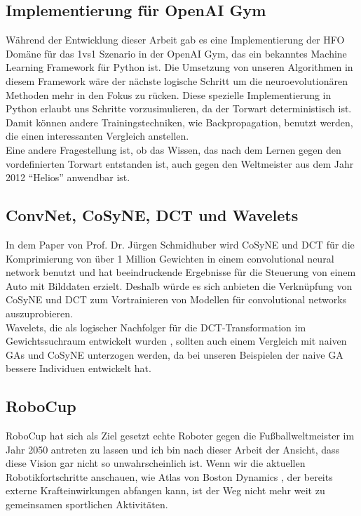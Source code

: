         \subsection*{Implementierung für OpenAI Gym}
            Während der Entwicklung dieser Arbeit gab es eine Implementierung der HFO Domäne für das 1vs1 Szenario in der OpenAI Gym, das ein bekanntes Machine Learning Framework für Python ist. Die Umsetzung von unseren Algorithmen in diesem Framework wäre der nächste logische Schritt um die neuroevolutionären Methoden mehr in den Fokus zu rücken. Diese spezielle Implementierung in Python erlaubt uns Schritte vorzusimulieren, da der Torwart deterministisch ist. Damit können andere Trainingstechniken, wie Backpropagation, benutzt werden, die einen interessanten Vergleich anstellen.\\

            \noindent
            Eine andere Fragestellung ist, ob das Wissen, das nach dem Lernen gegen den vordefinierten Torwart entstanden ist, auch gegen den Weltmeister aus dem Jahr 2012 ``Helios'' anwendbar ist.


        \subsection*{ConvNet, CoSyNE, DCT und Wavelets}
            In dem Paper von Prof. Dr. Jürgen Schmidhuber \cite{cosyne4} wird CoSyNE und DCT für die Komprimierung von über 1 Million Gewichten in einem convolutional neural network benutzt und hat beeindruckende Ergebnisse für die Steuerung von einem Auto mit Bilddaten erzielt. Deshalb würde es sich anbieten die Verknüpfung von CoSyNE und DCT zum Vortrainieren von Modellen für convolutional networks auszuprobieren. \\

            \noindent
            Wavelets, die  als logischer Nachfolger für die DCT-Transformation im Gewichtssuchraum entwickelt wurden \cite{wavelet}, sollten auch einem Vergleich mit naiven GAs und CoSyNE unterzogen werden, da bei unseren Beispielen der naive GA bessere Individuen entwickelt hat.

        \subsection*{RoboCup}
            RoboCup hat sich als Ziel gesetzt echte Roboter gegen die Fußballweltmeister im Jahr 2050 antreten zu lassen und ich bin nach dieser Arbeit der Ansicht, dass diese Vision gar nicht so unwahrscheinlich ist. Wenn wir die aktuellen Robotikfortschritte anschauen, wie Atlas von Boston Dynamics \cite{robot}, der bereits externe Krafteinwirkungen abfangen kann, ist der Weg nicht mehr weit zu gemeinsamen sportlichen Aktivitäten.\\

